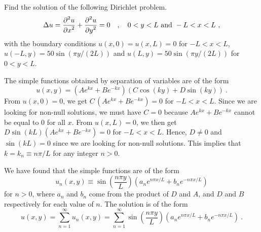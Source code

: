 \begin{egg}
Find the solution of the following Dirichlet problem.
\[
\Delta u = \frac{\displaystyle \partial^{2}{u}} {\displaystyle \partial x^{2}} + \frac{\displaystyle \partial^{2}{u}} {\displaystyle \partial y^{2}} = 0 \quad ,
\quad 0 < y < L \ \text{and} \ -L < x < L \ ,
\]
with the boundary conditions
$u(x,0) = u(x,L) = 0$ for $-L<x<L$,
$u(-L,y) = 50 \sin\left(\pi y/(2L)\right)$ and
$u(L,y) = 50 \sin\left(\pi y/(2L)\right)$ for $0<y<L$.

The simple functions obtained by separation of variables are of the
form
\[
u(x,y) = \left( A e^{kx} + B e^{-kx} \right)
\left(C \cos(ky) + D \sin(ky)\right) \ .
\]
From $u(x,0) = 0$, we get $C\,\left(A e^{kx} + B e^{-kx}\right)=0$ for
$-L<x<L$.  Since we are looking for non-null solutions, we must have
$C=0$ because $A e^{kx} + B e^{-kx}$ cannot be equal to $0$ for all
$x$.  From $u(x,L) = 0$, we then get 
$D\sin(kL)\left(A e^{kx} + B e^{-kx}\right)=0$ for $-L<x<L$.  Hence,
$D\neq 0$ and $\sin(kL)=0$ since we are looking for non-null
solutions.  This implies that $k = k_n \equiv n\pi/L$ for any integer $n>0$.

We have found that the simple functions are of the form
\[
u_n(x,y) \equiv \sin\left(\frac{n\pi y}{L}\right)
\left(a_n e^{n\pi x/L} + b_n e^{-n\pi x/L}\right)
\]
for $n > 0$, where $a_n$ and $b_n$ come from the product of $D$ and
$A$, and $D$ and $B$ respectively for each value of $n$.  The solution
is of the form
\[
u(x,y) = \sum_{n=1}^\infty u_n(x,y) = 
\sum_{n=1}^\infty \sin\left(\frac{n\pi y}{L}\right)
\left(a_n e^{n\pi x/L} + b_n e^{-n\pi x/L}\right) \ .
\]


\end{egg}
